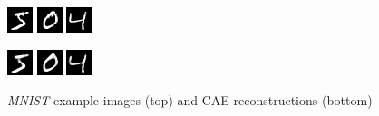 \documentclass[draft]{article}
\begin{document}
    \begin{figure}[h]
        \centering
        \includegraphics[width=0.1\linewidth]{../graphics/reconstructions/mnist/input_00.png}
        \includegraphics[width=0.1\linewidth]{../graphics/reconstructions/mnist/input_01.png}
        \includegraphics[width=0.1\linewidth]{../graphics/reconstructions/mnist/input_02.png}

        \includegraphics[width=0.1\linewidth]{../graphics/reconstructions/mnist/reconstruction_00.png}
        \includegraphics[width=0.1\linewidth]{../graphics/reconstructions/mnist/reconstruction_01.png}
        \includegraphics[width=0.1\linewidth]{../graphics/reconstructions/mnist/reconstruction_02.png}

        \caption{\emph{MNIST} example images (top) and CAE reconstructions (bottom)}
        \label{fig:mnist_reconstructions}
      \end{figure}
\end{document}
